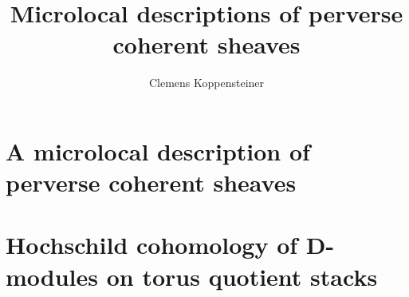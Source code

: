 \documentclass[english]{thesis}
\title{Microlocal descriptions of perverse coherent sheaves}
\author{Clemens Koppensteiner}
\begin{document}
\frontmatter

\maketitlepage

\tableofcontents

\mainmatter



\part{A microlocal description of perverse coherent sheaves}







\part{Hochschild cohomology of D-modules on torus quotient stacks}






\backmatter

\printbibliography
\end{document}
